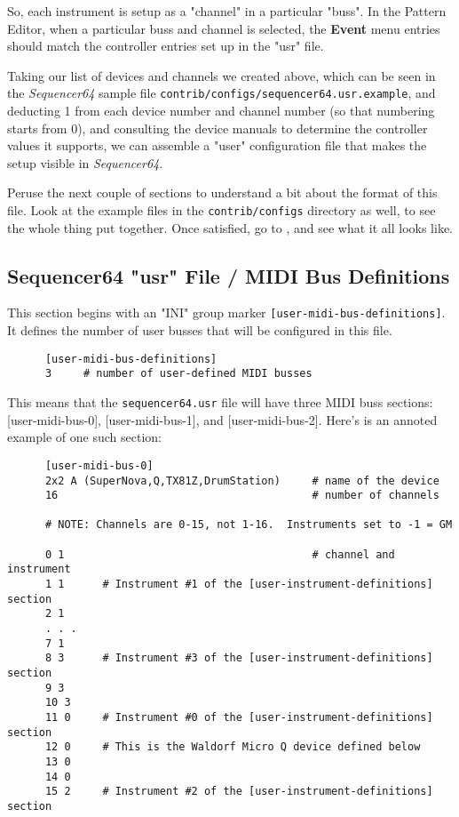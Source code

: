   So, each instrument is setup as a "channel" in a particular "buss".
   In the Pattern Editor, when a particular buss and channel is selected,
   the \textbf{Event} menu entries should match the controller entries set up
   in the "usr" file.

   Taking our list of devices and channels we created above, which
   can be seen in the \textsl{Sequencer64} sample file
   \texttt{contrib/configs/sequencer64.usr.example}, and 
   deducting 1 from each device number and channel number (so that numbering
   starts from 0), and consulting the device manuals to determine the
   controller values it supports, we can assemble a "user" configuration file
   that makes the setup visible in \textsl{Sequencer64}.

   Peruse the next couple of sections to understand a bit about the format of
   this file.  Look at the example files in the \texttt{contrib/configs}
   directory as well, to see the whole thing put together.
   Once satisfied, go to
   , and 
   see what it all looks like.

\subsection{Sequencer64 "usr" File / MIDI Bus Definitions}
\label{subsec:seq64_usr_file_midi_bus_definitions}

   This section begins with an
   "INI" group marker \texttt{[user-midi-bus-definitions]}.
   It defines the number of user busses that will be configured in this file.

   \begin{verbatim}
      [user-midi-bus-definitions]
      3     # number of user-defined MIDI busses
   \end{verbatim}

   This means that the \texttt{sequencer64.usr} file will have three MIDI buss
   sections: [user-midi-bus-0], [user-midi-bus-1], and [user-midi-bus-2].
   Here's is an annoted example of one such section:

   \begin{verbatim}
      [user-midi-bus-0]
      2x2 A (SuperNova,Q,TX81Z,DrumStation)     # name of the device
      16                                        # number of channels

      # NOTE: Channels are 0-15, not 1-16.  Instruments set to -1 = GM

      0 1                                       # channel and instrument
      1 1      # Instrument #1 of the [user-instrument-definitions] section
      2 1
      . . .
      7 1
      8 3      # Instrument #3 of the [user-instrument-definitions] section
      9 3
      10 3
      11 0     # Instrument #0 of the [user-instrument-definitions] section
      12 0     # This is the Waldorf Micro Q device defined below
      13 0
      14 0
      15 2     # Instrument #2 of the [user-instrument-definitions] section
   \end{verbatim}

